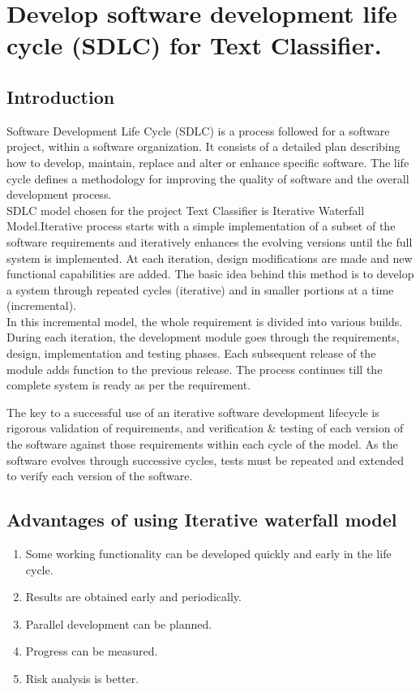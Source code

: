 \chapter{Develop software development life cycle (SDLC) for Text Classifier.}
\label{Practical:2}
\section{Introduction}
Software Development Life Cycle (SDLC) is a process followed for a software project, within a software organization. It consists of a detailed plan describing how to develop, maintain, replace and alter or enhance specific software. The life cycle defines a methodology for improving the quality of software and the overall development process.\\
SDLC model chosen for the project Text Classifier is Iterative Waterfall Model.Iterative process starts with a simple implementation of a subset of the software requirements and iteratively enhances the evolving versions until the full system is implemented. At each iteration, design modifications are made and new functional capabilities are added. The basic idea behind this method is to develop a system through repeated cycles (iterative) and in smaller portions at a time (incremental).\\
In this incremental model, the whole requirement is divided into various builds. During each iteration, the development module goes through the requirements, design, implementation and testing phases. Each subsequent release of the module adds function to the previous release. The process continues till the complete system is ready as per the requirement.

The key to a successful use of an iterative software development lifecycle is rigorous validation of requirements, and verification & testing of each version of the software against those requirements within each cycle of the model. As the software evolves through successive cycles, tests must be repeated and extended to verify each version of the software.
\section{Advantages of using Iterative waterfall model}
\begin{enumerate}
	\item Some working functionality can be developed quickly and early in the life cycle.
	\item Results are obtained early and periodically.
	\item Parallel development can be planned.
	\item Progress can be measured.
	\item Risk analysis is better.
\end{enumerate}
